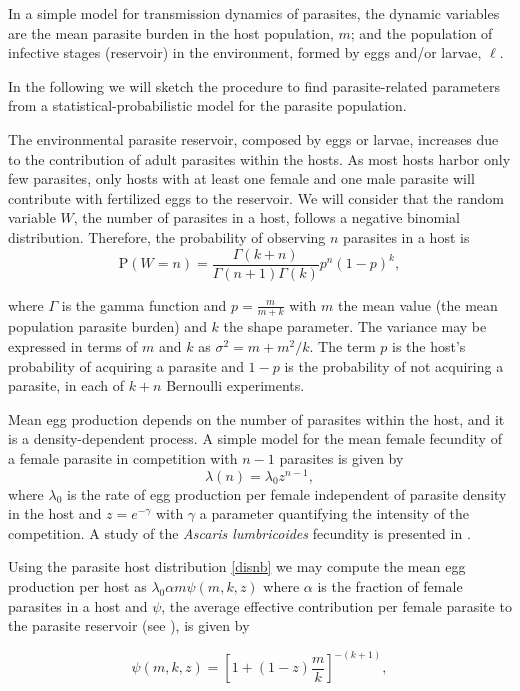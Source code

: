 \documentclass[eng]{MMSB-class-eng}
\begin{document}
In a simple model for transmission dynamics of parasites, 
the dynamic variables  are the mean parasite burden in the host population, $m$; and the population of infective stages (reservoir) in the environment, formed by eggs and/or larvae, $\ell$. 

In the following we will sketch the procedure to find parasite-related parameters from a statistical-probabilistic model for the parasite population.

The environmental parasite reservoir, composed by eggs or larvae, increases due to the contribution of adult parasites within the hosts. As most hosts harbor only few parasites, only hosts with at least one female and one male parasite will contribute with fertilized eggs to the reservoir. We will consider that the random variable $W$, the number of parasites in a host, follows a negative binomial distribution. 
Therefore, the probability of observing $n$ parasites in a host is
\begin{equation}\label{disnb}
\mathrm{P}(W=n)=\frac{\Gamma(k+n)}{\Gamma(n+1)\Gamma(k)}p^{n}(1-p)^k,
\end{equation}
{\color{red}
where $\Gamma$ is the gamma function and $p=\frac{m}{m+k}$ with   
$m$ the mean value (the mean population parasite burden) and $k$ the shape parameter. The variance may be expressed in terms of  $m$ and  $k$ as $\sigma^2=m+m^2/k$. 
The term $p$ is the host's probability of acquiring a parasite  and $1-p$ is the probability of not acquiring a parasite, 
in each of $k+n$ Bernoulli experiments. 


Mean egg production depends on the number of parasites within the host, and it is a density-dependent process. 
A simple model for the mean female fecundity of a female parasite in competition with $n-1$ parasites is given by 
\begin{equation}
\lambda(n)=\lambda_0 z^{n-1},
\end{equation}
where $\lambda_0$ is the rate of egg production per female independent of parasite density in the host and $z=e^{-\gamma}$ with $\gamma$ a parameter quantifying the intensity of the competition. A study of the \textit{Ascaris lumbricoides} fecundity is presented in \citet{hall2000geographical}. 


Using the parasite host distribution \eqref{disnb} we may compute the mean egg production per host as \citep{lopez2022general}
$\lambda_0
\alpha m
\psi(m,k,z)$
where $\alpha$  is the fraction of female parasites in a host and $\psi$, the average effective contribution per female parasite to the parasite reservoir (see \citet{churcher2006density,lopez2022general}), is given by}
\begin{equation}\label{psi}
\psi(m,k,z)=\left[ 1+(1-z)\dfrac{m}{k}\right]^{-(k+1)},
\end{equation}
\end{document}
